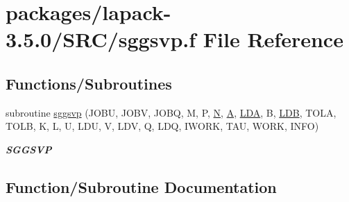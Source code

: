 \hypertarget{sggsvp_8f}{}\section{packages/lapack-\/3.5.0/\+S\+R\+C/sggsvp.f File Reference}
\label{sggsvp_8f}
\subsection*{Functions/\+Subroutines}
\begin{DoxyCompactItemize}
\item 
subroutine \hyperlink{sggsvp_8f_a0f766273df75b0fcbd25c694a5ae4d7a}{sggsvp} (J\+O\+B\+U, J\+O\+B\+V, J\+O\+B\+Q, M, P, \hyperlink{polmisc_8c_a0240ac851181b84ac374872dc5434ee4}{N}, \hyperlink{classA}{A}, \hyperlink{example__user_8c_ae946da542ce0db94dced19b2ecefd1aa}{L\+D\+A}, B, \hyperlink{example__user_8c_a50e90a7104df172b5a89a06c47fcca04}{L\+D\+B}, T\+O\+L\+A, T\+O\+L\+B, K, L, U, L\+D\+U, V, L\+D\+V, Q, L\+D\+Q, I\+W\+O\+R\+K, T\+A\+U, W\+O\+R\+K, I\+N\+F\+O)
\begin{DoxyCompactList}\small\item\em {\bfseries S\+G\+G\+S\+V\+P} \end{DoxyCompactList}\end{DoxyCompactItemize}


\subsection{Function/\+Subroutine Documentation}
\hypertarget{sggsvp_8f_a0f766273df75b0fcbd25c694a5ae4d7a}{}
